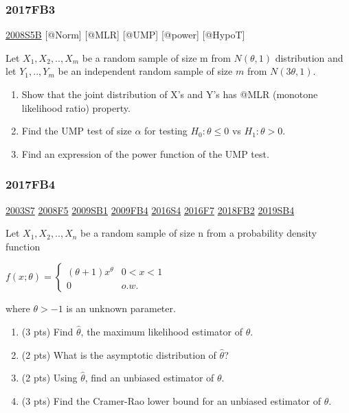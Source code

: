 \documentclass[6pt,twocolumn,Portrait]{article}
\begin{document}
\hypertarget{fb3-3}{%
\subsubsection{2017FB3}\label{fb3-3}}

\protect\hyperlink{s5b}{2008S5B} {[}@Norm{]} {[}@MLR{]} {[}@UMP{]}
{[}@power{]} {[}@HypoT{]}

Let \(X_1,X_2,..,X_{m}\) be a random sample of size m from
\(N(\theta,1)\) distribution and let \(Y_1,..,Y_m\) be an independent
random sample of size \(m\) from \(N(3\theta,1)\).

\begin{enumerate}
\def\labelenumi{(\alph{enumi})}
\item
  Show that the joint distribution of X's and Y's has @MLR (monotone
  likelihood ratio) property.
\item
  Find the UMP test of size \(\alpha\) for testing \(H_0:\theta\le0\) vs
  \(H_1:\theta>0\).
\item
  Find an expression of the power function of the UMP test.
\end{enumerate}

\hypertarget{fb4-3}{%
\subsubsection{2017FB4}\label{fb4-3}}

\protect\hyperlink{s7}{2003S7} \protect\hyperlink{f5-3}{2008F5}
\protect\hyperlink{sb1}{2009SB1} \protect\hyperlink{fb4}{2009FB4}
\protect\hyperlink{s4-4}{2016S4} \protect\hyperlink{f7-5}{2016F7}
\protect\hyperlink{fb2-4}{2018FB2} \protect\hyperlink{sb4-2}{2019SB4}

Let \(X_1,X_2,..,X_n\) be a random sample of size n from a probability
density function

\(f(x;\theta)=\begin{cases}(\theta+1)x^\theta& 0<x<1\\0& o.w.\end{cases}\)

where \(\theta>-1\) is an unknown parameter.

\begin{enumerate}
\def\labelenumi{(\alph{enumi})}
\item
  (3 pts) Find \(\hat\theta\), the maximum likelihood estimator of
  \(\theta\).
\item
  (2 pts) What is the asymptotic distribution of \(\hat\theta\)?
\item
  (2 pts) Using \(\hat\theta\), find an unbiased estimator of
  \(\theta\).
\item
  (3 pts) Find the Cramer-Rao lower bound for an unbiased estimator of
  \(\theta\).
\end{enumerate}
\end{document}
